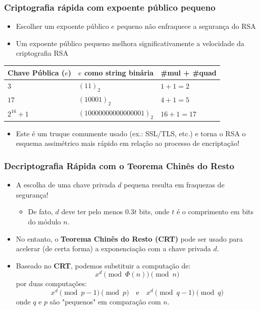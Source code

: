 \documentclass{beamer}
\begin{document}
\begin{frame}
\frametitle{Criptografia rápida com expoente público pequeno}

\begin{itemize}
    \item Escolher um expoente público $e$ pequeno não enfraquece a segurança do RSA
    \item Um expoente público pequeno melhora significativamente a velocidade da criptografia RSA
\end{itemize}

\vspace{0.5em} %
\begin{center}
\begin{tabularx}{1\textwidth}{X X X} %

\toprule
\textbf{Chave Pública ($e$)} & \textbf{$e$ como string binária} & \textbf{\#mul + \#quad} \\
\midrule
$3$ & $(11)_2$ & $1+1=2$ \\
$17$ & $(10001)_2$ & $4+1=5$ \\
$2^{16}+1$ & $(10000000000000001)_2$ & $16+1=17$ \\
\bottomrule
\end{tabularx}
\end{center}
\vspace{0.5em} %

\begin{itemize}
    \item Este é um truque comumente usado (ex.: SSL/TLS, etc.) e torna o RSA o esquema assimétrico mais rápido em relação ao processo de encriptação!
\end{itemize}

\end{frame}

\begin{frame}
\frametitle{Decriptografia Rápida com o Teorema Chinês do Resto}

\begin{itemize}
    \item A escolha de uma chave privada $d$ pequena resulta em fraquezas de segurança!
    \begin{itemize}
        \item De fato, $d$ deve ter pelo menos $0.3t$ bits, onde $t$ é o comprimento em bits do módulo $n$.
    \end{itemize}
    \item No entanto, o \textbf{Teorema Chinês do Resto (CRT)} pode ser usado para acelerar (de certa forma) a exponenciação com a chave privada $d$.
    \item Baseado no \textbf{CRT}, podemos substituir a computação de:
    \[ x^d \pmod{\Phi(n)} \pmod n \]
    por duas computações:
    \[ x^d \pmod{p-1} \pmod p \quad \text{e} \quad x^d \pmod{q-1} \pmod q \]
    onde $q$ e $p$ são "pequenos" em comparação com $n$.
\end{itemize}

\end{frame}
\end{document}
